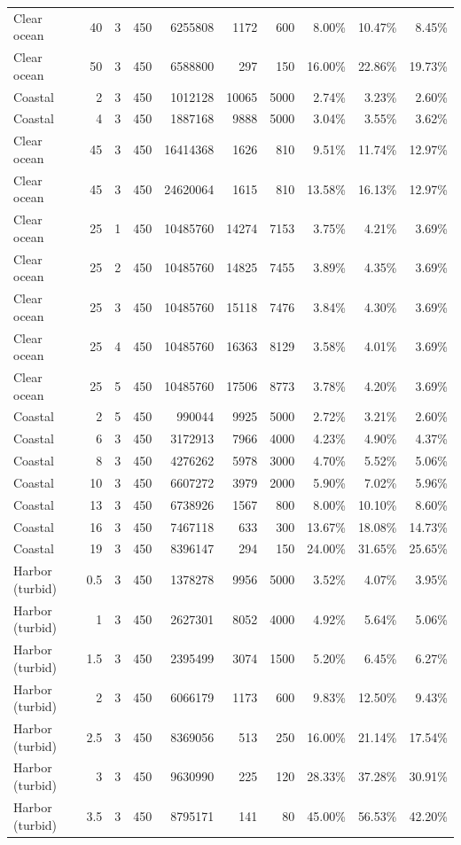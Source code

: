 \begin{tabular}{l r c c r r r r r r}
Clear ocean & 40 & 3 & 450 & 6255808 & 1172 & 600 & 8.00\% & 10.47\% & 8.45\% \\
Clear ocean & 50 & 3 & 450 & 6588800 & 297 & 150 & 16.00\% & 22.86\% & 19.73\% \\
Coastal & 2 & 3 & 450 & 1012128 & 10065 & 5000 & 2.74\% & 3.23\% & 2.60\% \\
Coastal & 4 & 3 & 450 & 1887168 & 9888 & 5000 & 3.04\% & 3.55\% & 3.62\% \\
Clear ocean & 45 & 3 & 450 & 16414368 & 1626 & 810 & 9.51\% & 11.74\% & 12.97\% \\
Clear ocean & 45 & 3 & 450 & 24620064 & 1615 & 810 & 13.58\% & 16.13\% & 12.97\% \\
Clear ocean & 25 & 1 & 450 & 10485760 & 14274 & 7153 & 3.75\% & 4.21\% & 3.69\% \\
Clear ocean & 25 & 2 & 450 & 10485760 & 14825 & 7455 & 3.89\% & 4.35\% & 3.69\% \\
Clear ocean & 25 & 3 & 450 & 10485760 & 15118 & 7476 & 3.84\% & 4.30\% & 3.69\% \\
Clear ocean & 25 & 4 & 450 & 10485760 & 16363 & 8129 & 3.58\% & 4.01\% & 3.69\% \\
Clear ocean & 25 & 5 & 450 & 10485760 & 17506 & 8773 & 3.78\% & 4.20\% & 3.69\% \\
Coastal & 2 & 5 & 450 & 990044 & 9925 & 5000 & 2.72\% & 3.21\% & 2.60\% \\
Coastal & 6 & 3 & 450 & 3172913 & 7966 & 4000 & 4.23\% & 4.90\% & 4.37\% \\
Coastal & 8 & 3 & 450 & 4276262 & 5978 & 3000 & 4.70\% & 5.52\% & 5.06\% \\
Coastal & 10 & 3 & 450 & 6607272 & 3979 & 2000 & 5.90\% & 7.02\% & 5.96\% \\
Coastal & 13 & 3 & 450 & 6738926 & 1567 & 800 & 8.00\% & 10.10\% & 8.60\% \\
Coastal & 16 & 3 & 450 & 7467118 & 633 & 300 & 13.67\% & 18.08\% & 14.73\% \\
Coastal & 19 & 3 & 450 & 8396147 & 294 & 150 & 24.00\% & 31.65\% & 25.65\% \\
Harbor (turbid) & 0.5 & 3 & 450 & 1378278 & 9956 & 5000 & 3.52\% & 4.07\% & 3.95\% \\
Harbor (turbid) & 1 & 3 & 450 & 2627301 & 8052 & 4000 & 4.92\% & 5.64\% & 5.06\% \\
Harbor (turbid) & 1.5 & 3 & 450 & 2395499 & 3074 & 1500 & 5.20\% & 6.45\% & 6.27\% \\
Harbor (turbid) & 2 & 3 & 450 & 6066179 & 1173 & 600 & 9.83\% & 12.50\% & 9.43\% \\
Harbor (turbid) & 2.5 & 3 & 450 & 8369056 & 513 & 250 & 16.00\% & 21.14\% & 17.54\% \\
Harbor (turbid) & 3 & 3 & 450 & 9630990 & 225 & 120 & 28.33\% & 37.28\% & 30.91\% \\
Harbor (turbid) & 3.5 & 3 & 450 & 8795171 & 141 & 80 & 45.00\% & 56.53\% & 42.20\% \\
\hline
\end{tabular}
